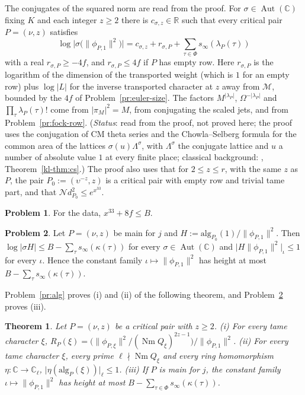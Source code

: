 \documentclass[reqno]{amsart}
\theoremstyle{definition}
\newtheorem{problem}{Problem}[section]
\theoremstyle{plain}
\newtheorem{theorem}{Theorem}[section]
\theoremstyle{remark}
\newcommand{\R}{\mathbb{R}}
\newcommand{\C}{\mathbb{C}}
\newcommand{\Mcal}{\mathcal{M}}
\newcommand{\Nc}{\mathcal{N}}
\newcommand{\Aut}{\operatorname{Aut}}
\newcommand{\Nm}{\operatorname{Nm}}
\newcommand{\alg}{\mathrm{alg}}
\begin{document}
The conjugates of the squared norm are read from the proof.  For \(\sigma \in \Aut(\C)\) fixing \(K\) and each integer \(z \ge 2\) there is \(c_{\sigma,z} \in \R\) such that every critical pair \(P = (\nu, z)\) satisfies
\[
  \log\bigl\lvert\sigma\bigl(\lVert\phi_{P,1}\rVert^2\bigr)\bigr\rvert = c_{\sigma,z} + r_{\sigma,P} + \sum_{\tau\in\Phi} s_\infty(\lambda_P(\tau))
\]
with a real \(r_{\sigma,P} \ge -4f\), and \(r_{\sigma,P} \le 4f\) if \(P\) has empty row.  Here \(r_{\sigma,P}\) is the logarithm of the dimension of the transported weight (which is \(1\) for an empty row) plus \(\log\lvert L\rvert\) for the inverse transported character at \(z\) away from \(\Mcal\), bounded by the \(4f\) of Problem~\ref{pr:euler-size}.  The factors \(M^{\lvert\lambda_P\rvert}\), \(\Omega^{-\lvert\lambda_P\rvert}\) and \(\prod_\tau\lambda_P(\tau)!\) come from \(\lvert\pi_M\rvert^2 = M\), from conjugating the scaled jets, and from Problem~\ref{pr:fock-row}.  (\emph{Status}: read from the proof, not proved here; the proof uses the conjugation of CM theta series and the Chowla--Selberg formula for the common area of the lattices \(\sigma(u)\Lambda^\sigma\), with \(\Lambda^\sigma\) the conjugate lattice and \(u\) a number of absolute value \(1\) at every finite place; classical background: \cite[Thm.~5.4]{Sh}, Theorem~\ref{kl-thm:cs}.)  The proof also uses that for \(2 \le z \le r\), with the same \(z\) as \(P\), the pair \(P_0 := (\upsilon^{-z}, z)\) is a critical pair with empty row and trivial tame part, and that \(\Nc d_{P_0}^2 \le e^{x^{33}}\).

\begin{problem}\label{pr:budget-size}
For the data, \(x^{33} + 8f \le B\).
\end{problem}

\begin{problem}\label{pr:height}
Let \(P = (\nu, z)\) be main for \(j\) and \(H := \alg_{P_0}(1)/\lVert\phi_{P,1}\rVert^2\).  Then \(\log\lvert\sigma H\rvert \le B - \sum_\tau s_\infty(\kappa(\tau))\) for every \(\sigma \in \Aut(\C)\) and \(\lvert H\lVert\phi_{P,1}\rVert^2\rvert_\iota \le 1\) for every \(\iota\).  Hence the constant family \(\iota \mapsto \lVert\phi_{P,1}\rVert^2\) has height at most \(B - \sum_\tau s_\infty(\kappa(\tau))\).
\end{problem}

Problem~\ref{pr:alg} proves (i) and (ii) of the following theorem, and Problem~\ref{pr:height} proves (iii).

\begin{theorem}\label{thm:pair}
Let \(P = (\nu, z)\) be a critical pair with \(z \ge 2\).
\textup{(i)} For every tame character \(\xi\), \(R_P(\xi) = \bigl(\lVert\phi_{P,\xi}\rVert^2/(\Nm Q_\xi)^{2z-1}\bigr)/\lVert\phi_{P,1}\rVert^2\).
\textup{(ii)} For every tame character \(\xi\), every prime \(\ell \nmid \Nm Q_\xi\) and every ring homomorphism \(\eta\colon\C\to\C_\ell\), \(\lvert\eta(\alg_P(\xi))\rvert_\ell \le 1\).
\textup{(iii)} If \(P\) is main for \(j\), the constant family \(\iota \mapsto \lVert\phi_{P,1}\rVert^2\) has height at most \(B - \sum_{\tau\in\Phi} s_\infty(\kappa(\tau))\).
\end{theorem}
\end{document}
